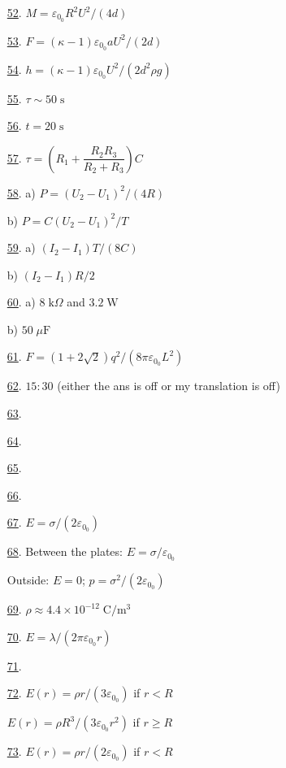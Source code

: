 \begin{multicols}{2}
\begin{enumerate}
	\item [\hyperlink{P52}{52}.] $M=\varepsilon_0_0R^2U^2/(4d)$ %
	\item [\hyperlink{P53}{53}.] $F=(\kappa-1)\varepsilon_0_0aU^2/(2d)$ %
	\item [\hyperlink{P54}{54}.] $h=(\kappa-1)\varepsilon_0_0U^2/(2d^2\rho g)$ %
	\item [\hyperlink{P55}{55}.] $\tau\sim 50\;\text{s}$ %
	\item [\hyperlink{P56}{56}.] $t=20\;\text{s}$ %
	\item [\hyperlink{P57}{57}.] $\tau=\left(R_1+\dfrac{R_2R_3}{R_2+R_3}\right)C$ %
	\item [\hyperlink{P58}{58}.] a) $P=(U_2-U_1)^2/(4R)$
	
	b) $P=C(U_2-U_1)^2/T$ %
	\item [\hyperlink{P59}{59}.] a) $(I_2-I_1)T/(8C)$
	
	b) $(I_2-I_1)R/2$ %
	\item [\hyperlink{P60}{60}.] a) $8\;\text{k}\Omega$ and $3.2\;\text{W}$
	
	b) $50\;\mu\text{F}$ %
	\item [\hyperlink{P61}{61}.] $F=(1+2\sqrt{2})q^2/(8\pi\varepsilon_0_0 L^2)$ %
	\item [\hyperlink{P62}{62}.] $15:30$ (either the ans is off or my translation is off) %
	\item [\hyperlink{P63}{63}.]  %
	\item [\hyperlink{P64}{64}.]  %
	\item [\hyperlink{P65}{65}.]  %
	\item [\hyperlink{P66}{66}.]  %
	\item [\hyperlink{P67}{67}.] $E=\sigma/(2\varepsilon_0_0)$ %
	\item [\hyperlink{P68}{68}.] Between the plates: $E=\sigma/\varepsilon_0_0$
	
	Outside: $E=0$; $p=\sigma^2/(2\varepsilon_0_0)$ %
	\item [\hyperlink{P69}{69}.] $\rho\approx4.4\times10^{-12}\;\text{C}/\text{m}^3$ %
	\item [\hyperlink{P70}{70}.] $E=\lambda/(2\pi\varepsilon_0_0r)$ %
	\item [\hyperlink{P71}{71}.]  %
	\item [\hyperlink{P72}{72}.] $E(r)=\rho r/(3\varepsilon_0_0)$ if $r<R$
	
	$E(r)=\rho R^3/(3\varepsilon_0_0r^2)$ if $r\geq R$ %
	\item [\hyperlink{P73}{73}.] $E(r)=\rho r/(2\varepsilon_0_0)$ if $r<R$
	

\end{enumerate}
\end{multicols}
